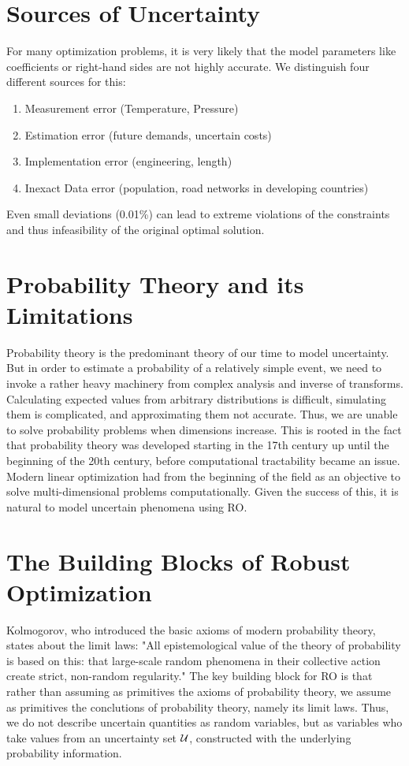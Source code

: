\section{Sources of Uncertainty}

For many optimization problems, it is very likely that the model parameters like coefficients or right-hand sides are not highly accurate. We distinguish four different sources for this:
\begin{enumerate}
	\item Measurement error (Temperature, Pressure)
	\item Estimation error (future demands, uncertain costs)
	\item Implementation error (engineering, length)
	\item Inexact Data error (population, road networks in developing countries)
\end{enumerate}
Even small deviations (0.01\%) can lead to extreme violations of the constraints and thus infeasibility of the original optimal solution.

\section{Probability Theory and its Limitations}

Probability theory is the predominant theory of our time to model uncertainty. But in order to estimate a probability of a relatively simple event, we need to invoke a rather heavy machinery from complex analysis and inverse of transforms. Calculating expected values from arbitrary distributions is difficult, simulating them is complicated, and approximating them not accurate. Thus, we are unable to solve probability problems when dimensions increase. This is rooted in the fact that probability theory was developed starting in the 17th century up until the beginning of the 20th century, before computational tractability became an issue. Modern linear optimization had from the beginning of the field as an objective to solve multi-dimensional problems computationally. Given the success of this, it is natural to model uncertain phenomena using RO.

\section{The Building Blocks of Robust Optimization}

Kolmogorov, who introduced the basic axioms of modern probability theory, states about the limit laws: "All epistemological value of the theory of probability is based on this: that large-scale random phenomena in their collective action create strict, non-random regularity." The key building block for RO is that rather than assuming as primitives the axioms of probability theory, we assume as primitives the conclutions of probability theory, namely its limit laws. Thus, we do not describe uncertain quantities as random variables, but as variables who take values from an uncertainty set $\mathcal{U}$, constructed with the underlying probability information.

